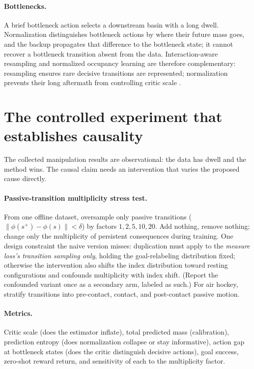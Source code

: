 \documentclass{article}
\begin{document}
\paragraph{Bottlenecks.}
A brief bottleneck action selects a downstream basin with a long dwell.
Normalization distinguishes bottleneck actions by where their future mass goes, and the backup propagates that difference to the bottleneck state; it cannot recover a bottleneck transition absent from the data.
Interaction-aware resampling and normalized occupancy learning are therefore complementary: resampling ensures rare decisive transitions are represented; normalization prevents their long aftermath from controlling critic scale \citep{shen2026interaction}.

\section{The controlled experiment that establishes causality}
\label{sec:multiplicity}

The collected manipulation results are observational: the data has dwell and the method wins.
The causal claim needs an intervention that varies the proposed cause directly.

\paragraph{Passive-transition multiplicity stress test.}
From one offline dataset, oversample only passive transitions ($\|\phi(s^+)-\phi(s)\| < \delta$) by factors $1, 2, 5, 10, 20$.
Add nothing, remove nothing; change only the multiplicity of persistent consequences during training.
One design constraint the naive version misses: duplication must apply to the \emph{measure loss's transition sampling only}, holding the goal-relabeling distribution fixed; otherwise the intervention also shifts the index distribution toward resting configurations and confounds multiplicity with index shift.
(Report the confounded variant once as a secondary arm, labeled as such.)
For air hockey, stratify transitions into pre-contact, contact, and post-contact passive motion.

\paragraph{Metrics.}
Critic scale (does the estimator inflate), total predicted mass (calibration), prediction entropy (does normalization collapse or stay informative), action gap at bottleneck states (does the critic distinguish decisive actions), goal success, zero-shot reward return, and sensitivity of each to the multiplicity factor.
\end{document}
